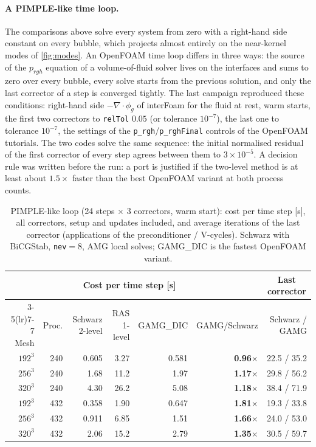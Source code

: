\documentclass[11pt,a4paper]{article}
\begin{document}
\paragraph{A PIMPLE-like time loop.} The comparisons above solve every system from zero with a right-hand
side constant on every bubble, which projects almost entirely on the near-kernel modes of \cref{fig:modes}.
An OpenFOAM time loop differs in three ways: the source of the $p_{rgh}$ equation of a volume-of-fluid
solver lives on the interfaces and sums to zero over every bubble, every solve starts from the previous
solution, and only the last corrector of a step is converged tightly. The last campaign reproduced these
conditions: right-hand side $-\nabla\cdot\phi_g$ of interFoam for the fluid at rest, warm starts, the first
two correctors to \texttt{relTol} $0.05$ (or tolerance $10^{-7}$), the last one to tolerance $10^{-7}$, the
settings of the \texttt{p\_rgh}/\texttt{p\_rghFinal} controls of the OpenFOAM tutorials. The two codes solve
the same sequence: the initial normalised residual of the first corrector of every step agrees between them
to $3\times10^{-5}$. A decision rule was written
before the run: a port is justified if the two-level method is at least about $1.5\times$ faster than the best
OpenFOAM variant at both process counts.

\begin{table}[t]
\centering\small
\caption{PIMPLE-like loop (24 steps $\times$ 3 correctors, warm start): cost per time step [s], all correctors,
setup and updates included, and average iterations of the last corrector (applications of the preconditioner /
V-cycles). Schwarz with BiCGStab, \texttt{nev}$=8$, AMG local solves; GAMG\_DIC is the fastest OpenFOAM
variant.}\label{tab:warm}
\begin{tabular}{@{}rrrrrrr@{}}
\toprule
& & \multicolumn{3}{c}{Cost per time step [s]} & & \multicolumn{1}{c}{Last corrector}\\
\cmidrule(lr){3-5}\cmidrule(lr){7-7}
Mesh & Proc. & Schwarz 2-level & RAS 1-level & GAMG\_DIC & GAMG/Schwarz & Schwarz / GAMG\\
\midrule
$192^3$ & 240 & 0.605 & 3.27 & 0.581 & \textbf{0.96}$\times$ & 22.5 / 35.2\\
$256^3$ & 240 & 1.68  & 11.2 & 1.97  & \textbf{1.17}$\times$ & 29.8 / 56.2\\
$320^3$ & 240 & 4.30  & 26.2 & 5.08  & \textbf{1.18}$\times$ & 38.4 / 71.9\\
$192^3$ & 432 & 0.358 & 1.90 & 0.647 & \textbf{1.81}$\times$ & 19.3 / 33.8\\
$256^3$ & 432 & 0.911 & 6.85 & 1.51  & \textbf{1.66}$\times$ & 24.0 / 53.0\\
$320^3$ & 432 & 2.06  & 15.2 & 2.79  & \textbf{1.35}$\times$ & 30.5 / 59.7\\
\bottomrule
\end{tabular}
\end{table}
\end{document}
